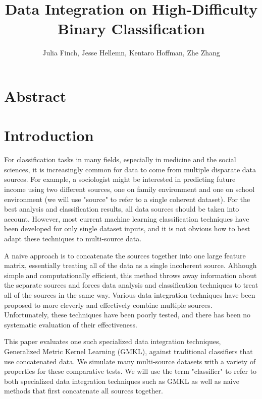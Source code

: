 \documentclass{article}
\begin{document}
\title{Data Integration on High-Difficulty Binary Classification}
\author{Julia Finch, Jesse Hellemn, Kentaro Hoffman, Zhe Zhang}
\maketitle


\section{Abstract}


\section{Introduction}
For classification tasks in many fields, especially in medicine and the social
sciences, it is increasingly common for data to come from multiple disparate
data sources. For example, a sociologist might be interested in predicting
future income using two different sources, one on family environment and one on
school environment (we will use "source" to refer to a single coherent
dataset). For the best analysis and classification results, all data sources
should be taken into account. However, most current machine learning
classification techniques have been developed for only single dataset inputs,
and it is not obvious how to best adapt these techniques to multi-source data.

A naive approach is to concatenate the sources together into one large feature
matrix, essentially treating all of the data as a single incoherent source.
Although simple and computationally efficient, this method throws away
information about the separate sources and forces data analysis and
classification techniques to treat all of the sources in the same way. Various
data integration techniques have been proposed to more cleverly and effectively
combine multiple sources. Unfortunately, these techniques have been poorly
tested, and there has been no systematic evaluation of their effectiveness.

This paper evaluates one such specialized data integration techniques,
Generalized Metric Kernel Learning (GMKL), against traditional classifiers that
use concatenated data. We simulate many multi-source datasets with a variety of
properties for these comparative tests. We will use the term "classifier" to
refer to both specialized data integration techniques such as GMKL as well as
naive methods that first concatenate all sources together.
\end{document}
